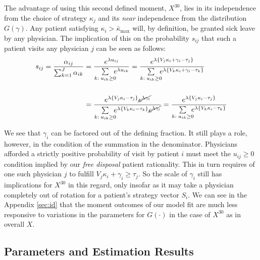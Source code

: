 \documentclass[../main.tex]{subfiles}
\begin{document}
The advantage of using this second defined moment, $X^{30}$, lies in its independence from the choice of strategy $\kappa_j$ and its \textit{near} independence from the distribution $G(\gamma)$. Any patient satisfying $\kappa_i > \bar{\kappa}_{\max}$ will, by definition, be granted sick leave by any physician. The implication of this on the probability $s_{ij}$ that such a patient visits any physician $j$ can be seen as follows:
\begin{align*}
    s_{ij} = \frac{\alpha_{ij}}{\sum_{k = 1}^{J} \alpha_{ik}} & =
    \frac{e^{\lambda u_{ij}}}{\sum\limits_{k : \; u_{ik} \geq 0} \hspace{-0.5em} e^{\lambda u_{ik}}} 
    =
    \frac{e^{\lambda \{V_j \kappa_i + \gamma_i - \tau_j \}}}{\sum\limits_{k : \; u_{ik} \geq 0} \hspace{-0.5em} e^{\lambda \{V_k \kappa_i + \gamma_i - \tau_k \}}} \\
    \\ 
   & = \frac{e^{\lambda \{V_j \kappa_i - \tau_j \}} \cancel{e^{\lambda \gamma_i}}}{\sum\limits_{k : \; u_{ik} \geq 0} \hspace{-0.5em} e^{\lambda \{V_k \kappa_i  - \tau_k \}} \cancel{e^{\lambda\gamma_i}}} =
    \frac{e^{\lambda \{V_j \kappa_i - \tau_j \}}}{\sum\limits_{k : \; u_{ik} \geq 0} \hspace{-0.5em} e^{\lambda \{V_k \kappa_i - \tau_k \}}}
\end{align*}

We see that $\gamma_i$ can be factored out of the defining fraction. It still plays a role, however, in the condition of the summation in the denominator. Physicians afforded a strictly positive probability of visit by patient $i$ must meet the $u_{ij} \geq 0$ condition implied by our \textit{free disposal} patient rationality. This in turn requires of one such physician $j$ to fulfill $V_j \kappa_i + \gamma_i \geq \tau_j$. So the scale of $\gamma_i$ still has implications for $X^{30}$ in this regard, only insofar as it may take a physician completely out of rotation for a patient's strategy vector $S_i$. We can see in the Appendix \ref{sec:id} that the moment outcomes of our model fit are much less responsive to variations in the parameters for $G(\cdot)$ in the case of $X^{30}$ as in overall $X$.


\subsection{Parameters and Estimation Results}
\end{document}
